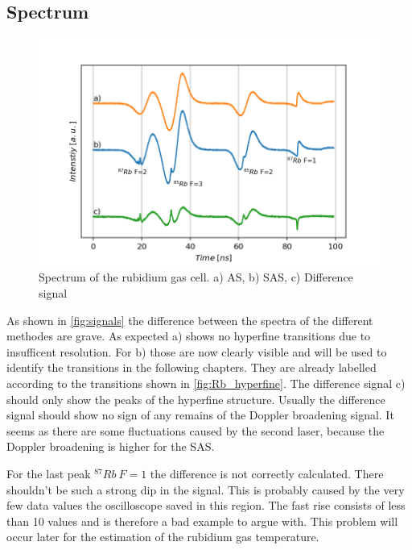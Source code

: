 \documentclass[]{article}
\begin{document}
\subsection{Spectrum}
\begin{figure}[H]
\centering
\includegraphics[width=.8\textwidth]{Plots/Diff_Signal.png}
\caption{Spectrum of the rubidium gas cell. a) AS, b) SAS, c) Difference signal}
\label{fig:signals}
\end{figure}

As shown in \autoref{fig:signals} the difference between the spectra of the different methodes are grave. As expected a) shows no hyperfine transitions due to insufficent resolution. For b) those are now clearly visible and will be used to identify the transitions in the following chapters. They are already labelled according to the transitions shown in \ref{fig:Rb_hyperfine}.
The difference signal c) should only show the peaks of the hyperfine structure.
Usually the difference signal should show no sign of any remains of the Doppler broadening signal. It seems as there are some fluctuations caused by the second laser, because the Doppler broadening is higher for the SAS. 

For the last peak  $^{87}Rb\ F=1$ the difference is not correctly calculated. There shouldn't be such a strong dip in the signal. This is probably caused by the very few data values the oscilloscope saved in this region. The fast rise consists of less than 10 values and is therefore a bad example to argue with. This problem will occur later for the estimation of the rubidium gas temperature.
\end{document}
